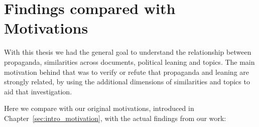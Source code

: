 \section{\statusgreen Findings compared with Motivations}
\label{sec:discussion_goals}

With this thesis we had the general goal to understand the relationship between propaganda, similarities across documents, political leaning and topics.
The main motivation behind that was to verify or refute that propaganda and leaning are strongly related, by using the additional dimensions of similarities and topics to aid that investigation.



Here we compare with our original motivations, introduced in Chapter~\ref{sec:intro_motivation}, %
with the actual findings from our work:



